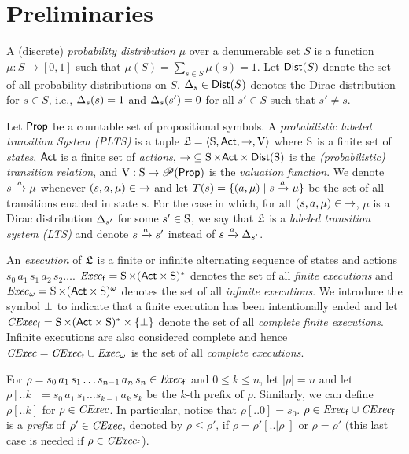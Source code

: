 \section{Preliminaries}
\label{sec:preliminaries}


A (discrete) \emph{probability distribution} $\mu$ over a denumerable
set $S$ is a function $\mu: S \rightarrow [0, 1] $ such that
$\mu(S) = \sum_{s \in S} \mu(s) = 1$.  Let $\Dist(S)$ denote the set
of all probability distributions on $S$.  $\Dirac_s \in \Dist(S)$
denotes the Dirac distribution for $s \in S$, i.e., $\Dirac_s(s) =1$
and $\Dirac_s(s') = 0$ for all $s' \in S$ such that $s'\neq s$.

Let $\Prop$ be a countable set of propositional symbols.
%
A \emph{probabilistic labeled transition System (PLTS)} is a tuple
$\model=\tup{\S,\Act,\ra,\V}$ where $\S$ is a finite set of
\emph{states}, $\Act$ is a finite set of \emph{actions},
${\ra}\subseteq {\S \times \Act \times \Dist(\S)}$ is the
\emph{(probabilistic) transition relation}, and
$\V:\S\to\powerset(\Prop)$ is the \emph{valuation function}.
%
We denote $s\reach{a}\mu$ whenever $(s,a,\mu)\in{\ra}$ and let
$T(s)=\{(a,\mu)\mid {s\reach{a}\mu}\}$ be the set of all transitions
enabled in state $s$.
%
For the case in which, for all $(s,a,\mu)\in{\ra}$, $\mu$ is a Dirac
distribution $\Dirac_{s'}$ for some $s'\in\S$, we say that $\model$ is
a \emph{labeled transition system (LTS)} and denote $s\reach{a}s'$
instead of $s\reach{a}\Dirac_{s'}$.

An \emph{execution} of $\model$ is a finite or infinite alternating
sequence of states and actions $s_0\, a_1\, s_1\, a_2\, s_2\ldots$.
$\execf= \S\times(\Act\times\S)^*$ denotes the set of all
\emph{finite executions} and $\execw= \S\times(\Act\times\S)^\omega$
denotes the set of all \emph{infinite executions}.
%
We introduce the symbol $\complete$ to indicate that a finite
execution has been intentionally ended and let $\cexecf=
\S\times(\Act\times\S)^*\times\{\complete\}$ denote the set of all
\emph{complete finite executions}.  Infinite executions are also
considered complete and hence $\cexec=\cexecf\cup\execw$ is the
set of all \emph{complete executions}.

For $\rho = s_0\, a_1\, s_1\ldots s_{n-1}\, a_n\, s_n \in \execf$ and
$0\leq k\leq n$, let $|\rho|=n$ and let
$\rho[..k] = s_0\, a_1\, s_1\ldots s_{k-1}\, a_k\, s_k$ be the $k$-th
prefix of $\rho$.
%
Similarly, we can define $\rho[..k]$ for $\rho\in\cexec$.
In particular, notice that $\rho[..0]=s_0$.
%
$\rho \in \execf\cup\cexecf$ is a \emph{prefix} of $\rho' \in \cexec$,
denoted by $\rho\leq\rho'$, if $\rho=\rho'[..|\rho|]$ or $\rho=\rho'$
(this last case is needed if $\rho\in\cexecf$).

